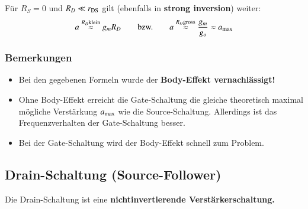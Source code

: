 Für $R_S = 0$ und $R_D \ll r_{\rm DS}$ gilt (ebenfalls in \textbf{strong inversion}) weiter: 
\[
    a \overset{R_D \text{klein}}{\approx} g_m R_D \qquad \text{bzw.} \qquad a \overset{R_D \text{gross}}{\approx} \frac{g_m}{g_o} \approx a_{\rm max}
\]

\subsubsection{Bemerkungen}
\begin{itemize}
    \item Bei den gegebenen Formeln wurde der \textbf{Body-Effekt vernachlässigt!}
    \item Ohne Body-Effekt erreicht die Gate-Schaltung die gleiche theoretisch maximal mögliche Verstärkung $a_{\rm max}$ wie die Source-Schaltung.
        Allerdings ist das Frequenzverhalten der Gate-Schaltung besser.
    \item Bei der Gate-Schaltung wird der Body-Effekt schnell zum Problem.
\end{itemize}



\subsection{Drain-Schaltung (Source-Follower)}

Die Drain-Schaltung ist eine \textbf{nichtinvertierende Verstärkerschaltung.}

\smallskip


